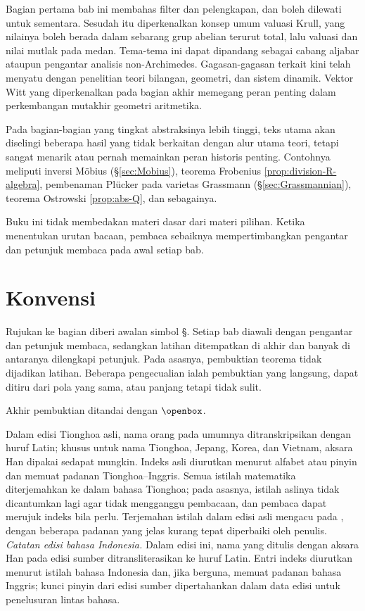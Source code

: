 \begin{asparadesc}
	\item[Bab 10: Valuasi medan] Bagian pertama bab ini membahas filter dan pelengkapan, dan boleh dilewati untuk sementara. Sesudah itu diperkenalkan konsep umum valuasi Krull, yang nilainya boleh berada dalam sebarang grup abelian terurut total, lalu valuasi dan nilai mutlak pada medan. Tema-tema ini dapat dipandang sebagai cabang aljabar ataupun pengantar analisis non-Archimedes. Gagasan-gagasan terkait kini telah menyatu dengan penelitian teori bilangan, geometri, dan sistem dinamik. Vektor Witt yang diperkenalkan pada bagian akhir memegang peran penting dalam perkembangan mutakhir geometri aritmetika.
\end{asparadesc}

Pada bagian-bagian yang tingkat abstraksinya lebih tinggi, teks utama akan diselingi beberapa hasil yang tidak berkaitan dengan alur utama teori, tetapi sangat menarik atau pernah memainkan peran historis penting. Contohnya meliputi inversi Möbius (\S\ref{sec:Mobius}), teorema Frobenius \ref{prop:division-R-algebra}, pembenaman Plücker pada varietas Grassmann (\S\ref{sec:Grassmannian}), teorema Ostrowski \ref{prop:abs-Q}, dan sebagainya.

Buku ini tidak membedakan materi dasar dari materi pilihan. Ketika menentukan urutan bacaan, pembaca sebaiknya mempertimbangkan pengantar dan petunjuk membaca pada awal setiap bab.

\section*{Konvensi}
Rujukan ke bagian diberi awalan simbol \S. Setiap bab diawali dengan pengantar dan petunjuk membaca, sedangkan latihan ditempatkan di akhir dan banyak di antaranya dilengkapi petunjuk. Pada asasnya, pembuktian teorema tidak dijadikan latihan. Beberapa pengecualian ialah pembuktian yang langsung, dapat ditiru dari pola yang sama, atau panjang tetapi tidak sulit.

Akhir pembuktian ditandai dengan $\openbox$.

Dalam edisi Tionghoa asli, nama orang pada umumnya ditranskripsikan dengan huruf Latin; khusus untuk nama Tionghoa, Jepang, Korea, dan Vietnam, aksara Han dipakai sedapat mungkin. Indeks asli diurutkan menurut alfabet atau pinyin dan memuat padanan Tionghoa--Inggris. Semua istilah matematika diterjemahkan ke dalam bahasa Tionghoa; pada asasnya, istilah aslinya tidak dicantumkan lagi agar tidak mengganggu pembacaan, dan pembaca dapat merujuk indeks bila perlu. Terjemahan istilah dalam edisi asli mengacu pada \cite{ZG}, dengan beberapa padanan yang jelas kurang tepat diperbaiki oleh penulis. \emph{Catatan edisi bahasa Indonesia.} Dalam edisi ini, nama yang ditulis dengan aksara Han pada edisi sumber ditransliterasikan ke huruf Latin. Entri indeks diurutkan menurut istilah bahasa Indonesia dan, jika berguna, memuat padanan bahasa Inggris; kunci pinyin dari edisi sumber dipertahankan dalam data edisi untuk penelusuran lintas bahasa.

